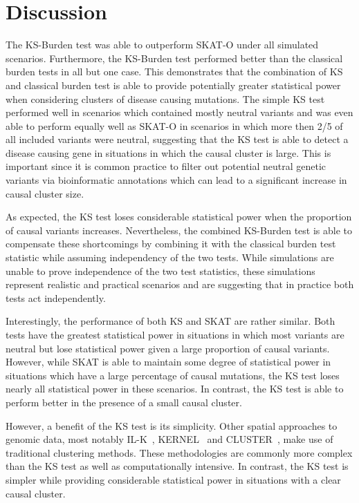 \section{Discussion}
\label{sec:discussion_ks}

The KS-Burden test was able to outperform SKAT-O under all simulated scenarios.
Furthermore, the KS-Burden test performed better than the classical burden tests in all but one case.
This demonstrates that the combination of KS and classical burden test is able to provide potentially greater statistical power when considering clusters of disease causing mutations.
The simple KS test performed well in scenarios which contained mostly neutral variants and was even able to perform equally well as SKAT-O in scenarios in which more then 2/5 of all included variants were neutral, suggesting that the KS test is able to detect a disease causing gene in situations in which the causal cluster is large.
This is important since it is common practice to filter out potential neutral genetic variants via bioinformatic annotations which can lead to a significant increase in causal cluster size.

As expected, the KS test loses considerable statistical power when the proportion of causal variants increases.
Nevertheless, the combined KS-Burden test is able to compensate these shortcomings by combining it with the classical burden test statistic while assuming independency of the two tests.
While simulations are unable to prove independence of the two test statistics, these simulations represent realistic and practical scenarios and are suggesting that in practice both tests act independently.

Interestingly, the performance of both KS and SKAT are rather similar.
Both tests have the greatest statistical power in situations in which most variants are neutral but lose statistical power given a large proportion of causal variants.
However, while SKAT is able to maintain some degree of statistical power in situations which have a large percentage of causal mutations, the KS test loses nearly all statistical power in these scenarios.
In contrast, the KS test is able to perform better in the presence of a small causal cluster.

However, a benefit of the KS test is its simplicity.
Other spatial approaches to genomic data, most notably IL-K~\cite{Ionita-Laza2012}, KERNEL~\cite{Schaid2013} and CLUSTER~\cite{Lin2014}, make use of traditional clustering methods.
These methodologies are commonly more complex than the KS test as well as computationally intensive.
In contrast, the KS test is simpler while providing considerable statistical power in situations with a clear causal cluster.

